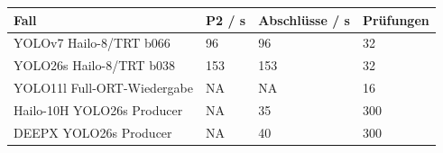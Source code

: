 \begin{tabular}{llll}
\hline
Fall & P2 / s & Abschlüsse / s & Prüfungen \\
\hline
YOLOv7 Hailo-8/TRT b066 & 96 & 96 & 32 \\
YOLO26s Hailo-8/TRT b038 & 153 & 153 & 32 \\
YOLO11l Full-ORT-Wiedergabe & NA & NA & 16 \\
Hailo-10H YOLO26s Producer & NA & 35 & 300 \\
DEEPX YOLO26s Producer & NA & 40 & 300 \\
\hline
\end{tabular}
